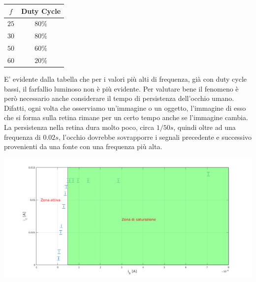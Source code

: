 \documentclass[letterpaper,11pt]{article}
\begin{document}
\begin{body}
 \begin{table}[H]
\centering
\begin{tabular}{c|c}
\toprule
 $f$ & Duty Cycle\\
\midrule
$ 25$ & $80 \% $  \\
$30$ &  $80 \%$ \\
$50$ &  $60 \%$ \\
$60$ &  $20\%$\\
\bottomrule
\end{tabular}
\end{table}
E' evidente dalla tabella che per i valori più alti di frequenza, già con duty cycle bassi, il farfallio luminoso non è più evidente. \newline
Per valutare bene il fenomeno è però necessario anche considerare il tempo di persistenza dell'occhio umano. Difatti, ogni volta che osserviamo un'immagine o un oggetto, l'immagine di esso che si forma sulla retina rimane per un certo tempo anche se l'immagine cambia. La persistenza nella retina dura molto poco, circa $ 1/50 s $, quindi oltre ad una frequenza di $ 0.02 s $, l'occhio dovrebbe sovrapporre i segnali precedente e successivo provenienti da una fonte con una frequenza più alta. 
 

\newpage
\begin{figurehere}
\centering
\includegraphics[width=1\textwidth]{sat.png}
\caption{Zona di saturazione e zona attiva del transistor}
\end{figurehere}
\end{body}
\end{document}
